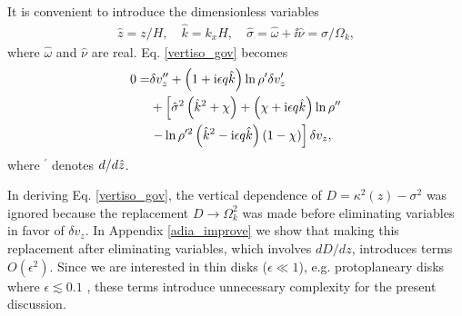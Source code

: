 It is convenient to introduce the dimensionless variables
\begin{align}
  \hat{z} = z/H,\quad \hat{k}=k_xH, \quad \hat{\sigma} =\hat{\omega} +
  \ii\hat{\nu}= \sigma/\Omega_k,
\end{align}
where $\hat{\omega}$ and $\hat{\nu}$ are real. 
Eq. \ref{vertiso_gov} becomes 
\begin{align}
  0=& \delta v_z ^{\prime\prime} + \left(1 + \mathrm{i}\epsilon
    q\hat{k}\right)\ln\rho^{\prime}\delta v_z^\prime \notag\\
  &+
  \left[\hat{\sigma}^2\left(\hat{k}^2+\chi\right) +
    \left(  \chi + \mathrm{i} \epsilon q\hat{k}\right)\ln\rho^{\prime\prime}\right.
  \notag\\
  &\left.- \ln\rho^{\prime
      2}\left(\hat{k}^2 -
      \mathrm{i}\epsilon
      q\hat{k}\right)\left(1 - \chi\right)\right]\delta v_z,\label{vertiso_gov_nondim}
\end{align}
where $^\prime$ denotes $d/d\hat{z}$.%

In deriving Eq. \ref{vertiso_gov}, the vertical dependence of
$D=\kappa^2(z)-\sigma^2$ was ignored because the replacement
$D\to\Omega_k^2$ was made before eliminating variables in favor of
$\delta v_z$. In Appendix \ref{adia_improve} we show that making this
replacement after eliminating variables, which involves $dD/dz$,
introduces terms $O(\epsilon^2)$. Since we are interested in 
thin disks ($\epsilon\ll 1 $), e.g. protoplaneary disks where 
$\epsilon\lesssim 0.1$ \citep{chiang10}, these terms introduce
unnecessary complexity for the present discussion. %







      



